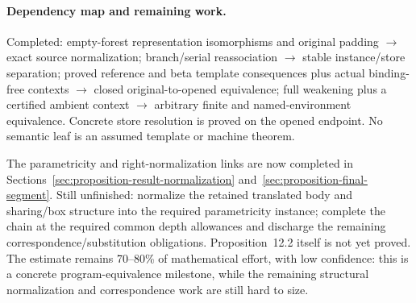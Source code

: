 


\paragraph{Dependency map and remaining work.}
Completed: empty-forest representation isomorphisms and original padding
$\to$ exact source normalization; branch/serial reassociation $\to$ stable
instance/store separation; proved reference and beta template consequences
plus actual binding-free contexts $\to$ closed original-to-opened equivalence;
full weakening plus a certified ambient context $\to$ arbitrary finite and
named-environment equivalence. Concrete store resolution is proved on the
opened endpoint. No semantic leaf is an assumed template or machine theorem.

The parametricity and right-normalization links are now completed in
Sections~\ref{sec:proposition-result-normalization} and~\ref{sec:proposition-final-segment}.
Still unfinished: normalize the retained translated body and sharing/box
structure into the required parametricity instance; complete the chain
at the required common depth allowances and discharge the remaining
correspondence/substitution obligations. Proposition~12.2 itself is not yet
proved. The estimate remains 70--80\% of mathematical effort, with low
confidence: this is a concrete program-equivalence milestone, while the
remaining structural normalization and correspondence work are still hard
to size.
